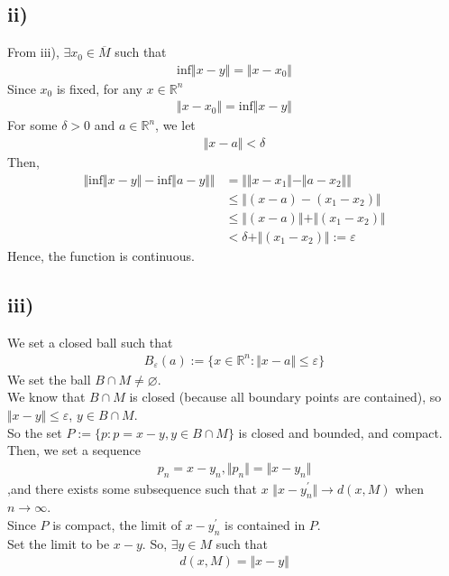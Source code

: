 \documentclass{article}
\begin{document}
\subsection*{ii)}
From iii), $\exists x_0\in \overline{M}$ such that
\begin{align*}
\mathrm{inf}\Vert x-y\Vert = \Vert x-x_0\Vert
\end{align*}
Since $x_0$ is fixed, for any $x\in\mathbb{R}^n$
\begin{align*}
\Vert x-x_0\Vert=\mathrm{inf}\Vert x-y\Vert
\end{align*}
For some $\delta>0$ and $a\in \mathbb{R}^n$, we let
\begin{align*}
\Vert x-a\Vert<\delta
\end{align*}
Then,
\begin{align*}
\Vert \mathrm{inf}\Vert x-y\Vert-\mathrm{inf}\Vert a-y\Vert\Vert&=\Vert \Vert x-x_1\Vert-\Vert a-x_2\Vert\Vert \\&\leq\Vert (x-a)-(x_1-x_2)\Vert\\ &\leq\Vert(x-a)\Vert+\Vert(x_1-x_2)\Vert\\ &<\delta +\Vert(x_1-x_2)\Vert:=\varepsilon
\end{align*}
Hence, the function is continuous.

\subsection*{iii)}
We set a closed ball such that
\begin{align*}
B_\varepsilon(a):=\lbrace x\in \mathbb{R}^n:\Vert x-a\Vert\leq \varepsilon\rbrace
\end{align*}
We set the ball $B \cap M \not= \varnothing$.\\
We know that $B \cap M$ is closed (because all boundary points are contained), so $\Vert x-y\Vert\leq \varepsilon$, $y\in B \cap M $.\\
So the set $P:=\lbrace p:p=x-y,y\in B \cap M\rbrace$ is closed and bounded, and compact.\\
Then, we set a sequence 
\begin{align*}
p_n=x-y_n, \Vert p_n\Vert=\Vert x-y_n\Vert
\end{align*}
,and there exists some subsequence such that $x$ $\Vert x-y_n^{'}\Vert\rightarrow d(x,M)$ when $n\rightarrow \infty$.\\
Since $P$ is compact, the limit of $x-y_n^{'}$ is contained in $P$.\\
Set the limit to be $x-y$. So, $\exists y\in M$ such that 
\begin{align*}
d(x,M)=\Vert x-y\Vert
\end{align*}
\end{document}
